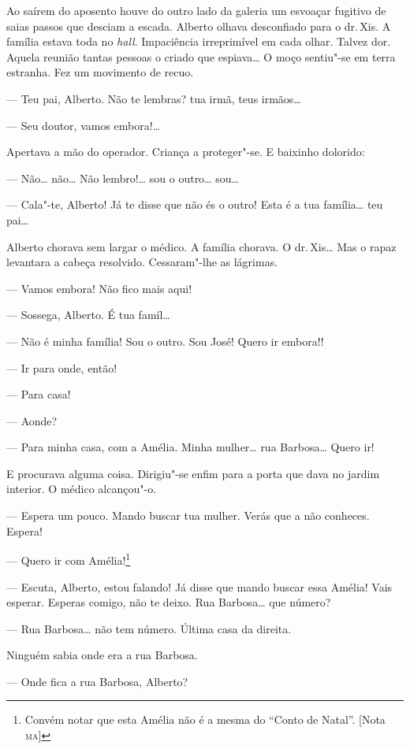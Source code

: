 Ao saírem do aposento houve do outro lado da galeria um esvoaçar
fugitivo de saias passos que desciam a escada. Alberto olhava
desconfiado para o dr.\,Xis. A família estava toda no \emph{hall}.
Impaciência irreprimível em cada olhar. Talvez dor. Aquela reunião
tantas pessoas o criado que espiava\ldots{} O moço sentiu"-se em terra
estranha. Fez um movimento de recuo.

--- Teu pai, Alberto. Não te lembras? tua irmã, teus irmãos\ldots{}

--- Seu doutor, vamos embora!\ldots{}

Apertava a mão do operador. Criança a proteger"-se. E baixinho dolorido:

--- Não\ldots{} não\ldots{} Não lembro!\ldots{} sou o outro\ldots{} sou\ldots{}

--- Cala"-te, Alberto! Já te disse que não és o outro! Esta é a tua
família\ldots{} teu pai\ldots{}

Alberto chorava sem largar o médico. A família chorava. O dr.\,Xis\ldots{} Mas
o rapaz levantara a cabeça resolvido. Cessaram"-lhe as lágrimas.

--- Vamos embora! Não fico mais aqui!

--- Sossega, Alberto. É tua famíl\ldots{}

--- Não é minha família! Sou o outro. Sou José! Quero ir embora!!

--- Ir para onde, então!

--- Para casa!

--- Aonde?

--- Para minha casa, com a Amélia. Minha mulher\ldots{} rua Barbosa\ldots{} Quero
ir!

E procurava alguma coisa. Dirigiu"-se enfim para a porta que dava no
jardim interior. O médico alcançou"-o.

--- Espera um pouco. Mando buscar tua mulher. Verás que a não conheces.
Espera!

--- Quero ir com Amélia!\footnote{Convém notar que esta Amélia não é a
  mesma do ``Conto de Natal''. {[}Nota \textsc{ma}{]}}

--- Escuta, Alberto, estou falando! Já disse que mando buscar essa
Amélia! Vais esperar. Esperas comigo, não te deixo. Rua Barbosa\ldots{} que
número?

--- Rua Barbosa\ldots{} não tem número. Última casa da direita.

Ninguém sabia onde era a rua Barbosa.

--- Onde fica a rua Barbosa, Alberto?

